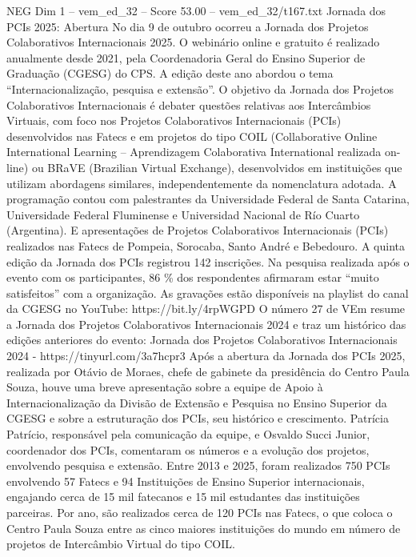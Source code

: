 \begin{textsample}{NEG Dim 1 – vem\_ed\_32 – Score 53.00 – vem\_ed\_32/t167.txt}  \label{ex:f1_neg_160}
Jornada dos PCIs 2025: Abertura No dia 9 de outubro ocorreu a Jornada dos Projetos Colaborativos Internacionais 2025.
O webinário online e gratuito é realizado anualmente desde 2021, pela Coordenadoria Geral do Ensino Superior de Graduação (CGESG) do CPS.
A edição deste ano abordou o tema “Internacionalização, pesquisa e extensão”.
O objetivo da Jornada dos Projetos Colaborativos Internacionais é debater questões relativas aos Intercâmbios Virtuais, com foco nos Projetos Colaborativos Internacionais (PCIs) desenvolvidos nas Fatecs e em projetos do tipo COIL (Collaborative Online International Learning – Aprendizagem Colaborativa International realizada on-line) ou BRaVE (Brazilian Virtual Exchange), desenvolvidos em instituições que utilizam abordagens similares, independentemente da nomenclatura adotada.
A programação contou com palestrantes da Universidade Federal de Santa Catarina, Universidade Federal Fluminense e Universidad Nacional de Río Cuarto (Argentina).
E apresentações de Projetos Colaborativos Internacionais (PCIs) realizados nas Fatecs de Pompeia, Sorocaba, Santo André e Bebedouro.
A quinta edição da Jornada dos PCIs registrou 142 inscrições.
Na pesquisa realizada após o evento com os participantes, 86 \% dos respondentes afirmaram estar “muito satisfeitos” com a organização.
As gravações estão disponíveis na playlist do canal da CGESG no YouTube: https://bit.ly/4rpWGPD O número 27 de VEm resume a Jornada dos Projetos Colaborativos Internacionais 2024 e traz um histórico das edições anteriores do evento: Jornada dos Projetos Colaborativos Internacionais 2024 - https://tinyurl.com/3a7hcpr3 Após a abertura da Jornada dos PCIs 2025, realizada por Otávio de Moraes, chefe de gabinete da presidência do Centro Paula Souza, houve uma breve apresentação sobre a equipe de Apoio à Internacionalização da Divisão de Extensão e Pesquisa no Ensino Superior da CGESG e sobre a estruturação dos PCIs, seu histórico e crescimento.
Patrícia Patrício, responsável pela comunicação da equipe, e Osvaldo Succi Junior, coordenador dos PCIs, comentaram os números e a evolução dos projetos, envolvendo pesquisa e extensão.
Entre 2013 e 2025, foram realizados 750 PCIs envolvendo 57 Fatecs e 94 Instituições de Ensino Superior internacionais, engajando cerca de 15 mil fatecanos e 15 mil estudantes das instituições parceiras.
Por ano, são realizados cerca de 120 PCIs nas Fatecs, o que coloca o Centro Paula Souza entre as cinco maiores instituições do mundo em número de projetos de Intercâmbio Virtual do tipo COIL.

\end{textsample}
